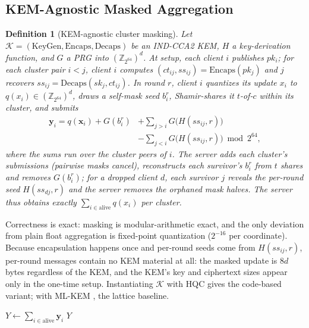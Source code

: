 \documentclass[lettersize,journal]{IEEEtran}
\newtheorem{definition}{Definition}
\begin{document}
\subsection{KEM-Agnostic Masked Aggregation}
\begin{definition}[KEM-agnostic cluster masking]\label{def:kem}
Let $\mathcal{K}=(\mathrm{KeyGen},\mathrm{Encaps},\mathrm{Decaps})$ be an IND-CCA2
KEM, $H$ a key-derivation function, and $G$ a PRG into $(\mathbb{Z}_{2^{64}})^d$.
At setup, each client $i$ publishes $pk_i$; for each cluster pair $i<j$, client $i$
computes $(ct_{ij}, ss_{ij})=\mathrm{Encaps}(pk_j)$ and $j$ recovers
$ss_{ij}=\mathrm{Decaps}(sk_j, ct_{ij})$. In round $r$, client $i$ quantizes its
update $x_i$ to $q(x_i)\in(\mathbb{Z}_{2^{64}})^d$, draws a self-mask seed $b_i^r$,
Shamir-shares it $t$-of-$c$ within its cluster, and submits
\begin{equation}\label{eq:mask}
\begin{split}
\mathbf{y}_i = q(\mathbf{x}_i) + G(b_i^r)
  &+ \sum_{j>i} G\big(H(ss_{ij}, r)\big)\\
  &- \sum_{j<i} G\big(H(ss_{ij}, r)\big) \bmod 2^{64},
\end{split}
\end{equation}
where the sums run over the cluster peers of $i$. The server adds each cluster's
submissions (pairwise masks cancel), reconstructs each survivor's $b_i^r$ from $t$
shares and removes $G(b_i^r)$; for a dropped client $d$, each survivor $j$ reveals
the per-round seed $H(ss_{dj}, r)$ and the server removes the orphaned mask halves.
The server thus obtains exactly $\sum_{i \in \mathrm{alive}} q(x_i)$ per cluster.
\end{definition}

Correctness is exact: masking is modular-arithmetic exact, and the only deviation
from plain float aggregation is fixed-point quantization ($2^{-16}$ per coordinate).
Because encapsulation happens once and per-round seeds come from $H(ss_{ij}, r)$,
per-round messages contain no KEM material at all: the masked update is $8d$ bytes
regardless of the KEM, and the KEM's key and ciphertext sizes appear only in the
one-time setup. Instantiating $\mathcal{K}$ with HQC gives the code-based variant;
with ML-KEM \cite{fips203}, the lattice baseline.

\begin{algorithm}[t]
\caption{Cluster Secure Aggregation (round $r$)}
\label{alg:secagg}
\DontPrintSemicolon
{}
$Y \leftarrow \sum_{i\in\mathrm{alive}} \mathbf{y}_i$ 
\Return $Y$\;
\end{algorithm}
\end{document}
